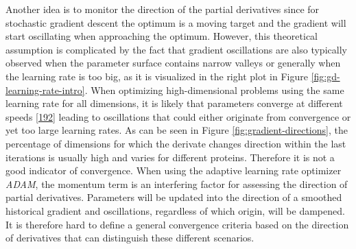 \documentclass[11pt,a4paper,twoside]{book}
\theoremstyle{definition}
\theoremstyle{definition}
\theoremstyle{remark}
\begin{document}
Another idea is to monitor the direction of the partial derivatives
since for stochastic gradient descent the optimum is a moving target and
the gradient will start oscillating when approaching the optimum.
However, this theoretical assumption is complicated by the fact that
gradient oscillations are also typically observed when the parameter
surface contains narrow valleys or generally when the learning rate is
too big, as it is visualized in the right plot in Figure
\ref{fig:gd-learning-rate-intro}. When optimizing high-dimensional
problems using the same learning rate for all dimensions, it is likely
that parameters converge at different speeds
{[}\protect\hyperlink{ref-Ruder2017}{192}{]} leading to oscillations
that could either originate from convergence or yet too large learning
rates. As can be seen in Figure \ref{fig:gradient-directions}, the
percentage of dimensions for which the derivate changes direction within
the last iterations is usually high and varies for different proteins.
Therefore it is not a good indicator of convergence. When using the
adaptive learning rate optimizer \emph{ADAM}, the momentum term is an
interfering factor for assessing the direction of partial derivatives.
Parameters will be updated into the direction of a smoothed historical
gradient and oscillations, regardless of which origin, will be dampened.
It is therefore hard to define a general convergence criteria based on
the direction of derivatives that can distinguish these different
scenarios.
\end{document}
